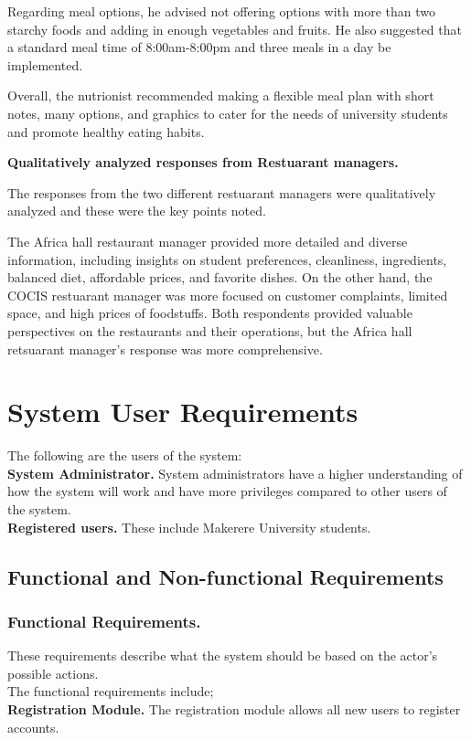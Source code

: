 \documentclass{article}
\begin{document}
\noindent Regarding meal options, he advised not offering options with more than two starchy foods and adding in enough vegetables and fruits. He also suggested that a standard meal time of 8:00am-8:00pm and three meals in a day be implemented.

\vspace{10pt}

\noindent Overall, the nutrionist recommended making a flexible meal plan with short notes, many options, and graphics to cater for the needs of university students and promote healthy eating habits.

\vspace{40pt}

\noindent
\textbf{Qualitatively analyzed responses from Restuarant managers.}

\noindent
The responses from the two different restuarant managers were qualitatively analyzed and these were the key points noted.

\noindent
The Africa hall restaurant manager provided more detailed and diverse information, including insights on student preferences, cleanliness, ingredients, balanced diet, affordable prices, and favorite dishes. On the other hand, the COCIS restuarant manager 
 was more focused on customer complaints, limited space, and high prices of foodstuffs. Both respondents provided valuable perspectives on the restaurants and their operations, but the Africa hall retsuarant manager's response was more comprehensive.

\newpage
\section{System User Requirements}
The following are the users of the system:\\
\textbf{System Administrator.} System administrators have a higher understanding of how the system will work and have more privileges compared to other users of the system.\\
\textbf{Registered users.} These include Makerere University students.

\subsection{Functional and Non-functional Requirements}
\subsubsection{Functional Requirements.}
These requirements describe what the system should be based on the actor’s possible actions.\\
The functional requirements include;\\
\textbf{Registration Module.} The registration module allows all new users to register accounts.
\end{document}
